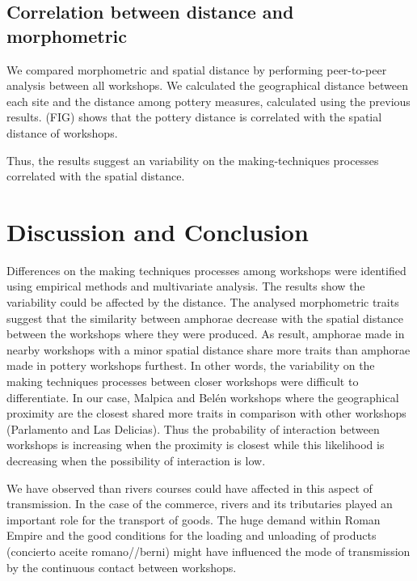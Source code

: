 \documentclass[review]{elsarticle}
\begin{document}
\subsection{Correlation between distance and morphometric}

We compared morphometric and spatial distance by performing peer-to-peer analysis between all workshops. We calculated the geographical distance between each site and the distance among pottery measures, calculated using the previous results. (FIG) shows that the pottery distance is correlated with the spatial distance of workshops.



Thus, the results suggest an variability on the making-techniques processes correlated with the spatial distance. 

\section{Discussion and Conclusion}


Differences on the making techniques processes among workshops were identified using empirical methods and multivariate analysis. The results show the variability could be affected by the distance. The analysed morphometric traits suggest that the similarity between amphorae decrease with the spatial distance between the workshops where they were produced. As result, amphorae made in nearby workshops with a minor spatial distance share more traits than amphorae made in pottery workshops furthest. In other words, the variability on the making techniques processes between closer workshops were difficult to differentiate. In our case, Malpica and Bel\'en workshops where the geographical proximity are the closest shared more traits in comparison with other workshops (Parlamento and Las Delicias). Thus the probability of interaction between workshops is increasing when the proximity is closest while this likelihood is decreasing when the possibility of interaction is low. 


We have observed than rivers courses could have affected in this aspect of transmission. In the case of the commerce, rivers and its tributaries played an important role for the transport of goods. The huge demand within Roman Empire and the good conditions for the loading and unloading of products (concierto aceite romano//berni) might have influenced the mode of transmission by the continuous contact between workshops. 
\end{document}
